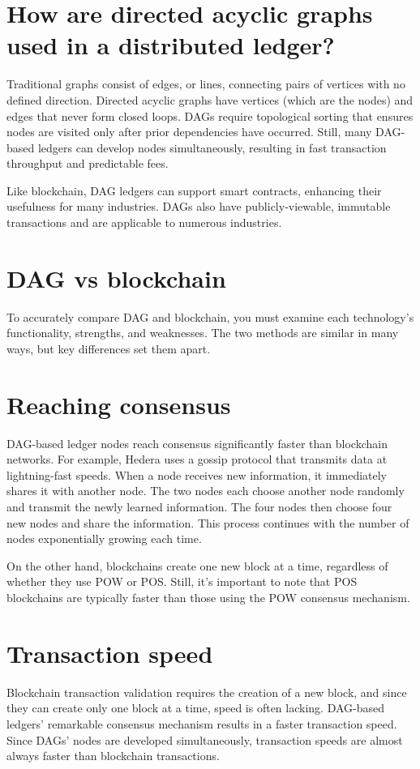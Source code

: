 \documentclass{article}
\begin{document}
\section{How are directed acyclic graphs used in a distributed ledger?}
Traditional graphs consist of edges, or lines, connecting pairs of vertices with no defined direction. Directed acyclic graphs have vertices (which are the nodes) and edges that never form closed loops. DAGs require topological sorting that ensures nodes are visited only after prior dependencies have occurred. Still, many DAG-based ledgers can develop nodes simultaneously, resulting in fast transaction throughput and predictable fees.

Like blockchain, DAG ledgers can support smart contracts, enhancing their usefulness for many industries. DAGs also have publicly-viewable, immutable transactions and are applicable to numerous industries.

\section{DAG vs blockchain}
To accurately compare DAG and blockchain, you must examine each technology’s functionality, strengths, and weaknesses. The two methods are similar in many ways, but key differences set them apart.

\section{Reaching consensus}
DAG-based ledger nodes reach consensus significantly faster than blockchain networks. For example, Hedera uses a gossip protocol that transmits data at lightning-fast speeds. When a node receives new information, it immediately shares it with another node. The two nodes each choose another node randomly and transmit the newly learned information. The four nodes then choose four new nodes and share the information. This process continues with the number of nodes exponentially growing each time.

On the other hand, blockchains create one new block at a time, regardless of whether they use POW or POS. Still, it’s important to note that POS blockchains are typically faster than those using the POW consensus mechanism.

\section{Transaction speed}
Blockchain transaction validation requires the creation of a new block, and since they can create only one block at a time, speed is often lacking. DAG-based ledgers’ remarkable consensus mechanism results in a faster transaction speed. Since DAGs’ nodes are developed simultaneously, transaction speeds are almost always faster than blockchain transactions.
\end{document}
